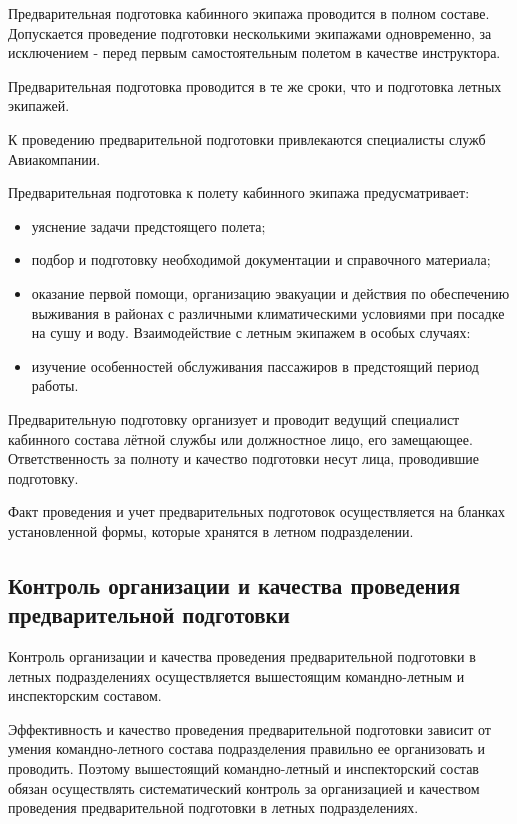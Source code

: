 Предварительная подготовка кабинного экипажа проводится в полном составе. Допускается проведение подготовки несколькими экипажами одновременно, за исключением - перед первым самостоятельным полетом в качестве инструктора.

Предварительная подготовка проводится в те же сроки, что и подготовка летных экипажей.

К проведению предварительной подготовки привлекаются специалисты служб Авиакомпании.

Предварительная подготовка к полету кабинного экипажа предусматривает:
\begin{itemize}
    \item уяснение задачи предстоящего полета;
    \item подбор и подготовку необходимой документации и справочного материала;
    \item оказание первой помощи, организацию эвакуации и действия по обеспечению выживания в районах с различными климатическими условиями при посадке на сушу и воду. Взаимодействие с летным экипажем в особых случаях:
    \item изучение особенностей обслуживания пассажиров в предстоящий период работы.
\end{itemize}

Предварительную подготовку организует и проводит ведущий специалист кабинного состава лётной службы или должностное лицо, его замещающее. Ответственность за полноту и качество подготовки несут лица, проводившие подготовку.

Факт проведения и учет предварительных подготовок осуществляется на бланках установленной формы, которые хранятся в летном подразделении.

\subsection{Контроль организации и качества проведения предварительной подготовки}\label{ssec:pre-check}


Контроль организации и качества проведения предварительной подготовки в летных подразделениях осуществляется вышестоящим командно-летным и инспекторским составом.

Эффективность и качество проведения предварительной подготовки зависит от умения командно-летного состава подразделения правильно ее организовать и проводить. Поэтому вышестоящий командно-летный и инспекторский состав обязан осуществлять систематический контроль за организацией и качеством проведения предварительной подготовки в летных подразделениях.

